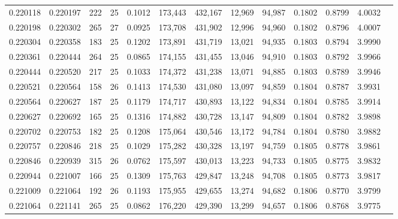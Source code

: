 \begin{tabular}{rrrrrrrrrrrrr}
0.220118 & 0.220197 &   222 &  25 &                                     0.1012 & 173,443 & 432,167 &  12,969 &  94,987 & 0.1802 & 0.8799 & 4.0032 \\
0.220198 & 0.220302 &   265 &  27 &                                     0.0925 & 173,708 & 431,902 &  12,996 &  94,960 & 0.1802 & 0.8796 & 4.0007 \\
0.220304 & 0.220358 &   183 &  25 &                                     0.1202 & 173,891 & 431,719 &  13,021 &  94,935 & 0.1803 & 0.8794 & 3.9990 \\
0.220361 & 0.220444 &   264 &  25 &                                     0.0865 & 174,155 & 431,455 &  13,046 &  94,910 & 0.1803 & 0.8792 & 3.9966 \\
0.220444 & 0.220520 &   217 &  25 &                                     0.1033 & 174,372 & 431,238 &  13,071 &  94,885 & 0.1803 & 0.8789 & 3.9946 \\
0.220521 & 0.220564 &   158 &  26 &                                     0.1413 & 174,530 & 431,080 &  13,097 &  94,859 & 0.1804 & 0.8787 & 3.9931 \\
0.220564 & 0.220627 &   187 &  25 &                                     0.1179 & 174,717 & 430,893 &  13,122 &  94,834 & 0.1804 & 0.8785 & 3.9914 \\
0.220627 & 0.220692 &   165 &  25 &                                     0.1316 & 174,882 & 430,728 &  13,147 &  94,809 & 0.1804 & 0.8782 & 3.9898 \\
0.220702 & 0.220753 &   182 &  25 &                                     0.1208 & 175,064 & 430,546 &  13,172 &  94,784 & 0.1804 & 0.8780 & 3.9882 \\
0.220757 & 0.220846 &   218 &  25 &                                     0.1029 & 175,282 & 430,328 &  13,197 &  94,759 & 0.1805 & 0.8778 & 3.9861 \\
0.220846 & 0.220939 &   315 &  26 &                                     0.0762 & 175,597 & 430,013 &  13,223 &  94,733 & 0.1805 & 0.8775 & 3.9832 \\
0.220944 & 0.221007 &   166 &  25 &                                     0.1309 & 175,763 & 429,847 &  13,248 &  94,708 & 0.1805 & 0.8773 & 3.9817 \\
0.221009 & 0.221064 &   192 &  26 &                                     0.1193 & 175,955 & 429,655 &  13,274 &  94,682 & 0.1806 & 0.8770 & 3.9799 \\
0.221064 & 0.221141 &   265 &  25 &                                     0.0862 & 176,220 & 429,390 &  13,299 &  94,657 & 0.1806 & 0.8768 & 3.9775 \\

\end{tabular}

